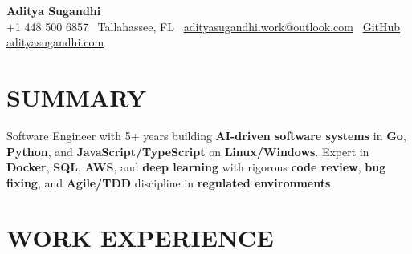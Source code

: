 \documentclass[letterpaper,10pt]{article}
\begin{document}
\begin{center}
{\huge\textbf{Aditya Sugandhi}} \\
+1 448 500 6857 \textbar\ \textcolor{metablue}{Tallahassee, FL} \textbar\
\href{mailto:adityasugandhi.work@outlook.com}{adityasugandhi.work@outlook.com} \textbar\
\href{https://github.com/adityasugandhi}{GitHub}
\textbar \href{https://adityasugandhi.com}{adityasugandhi.com}
\end{center}
\vspace{-12pt}

\section{\textcolor{metablue}{SUMMARY}}
\small
\vspace{-6pt}
Software Engineer with 5+ years building \textbf{AI-driven software systems} in \textbf{Go}, \textbf{Python}, and \textbf{JavaScript/TypeScript} on \textbf{Linux/Windows}. Expert in \textbf{Docker}, \textbf{SQL}, \textbf{AWS}, and \textbf{deep learning} with rigorous \textbf{code review}, \textbf{bug fixing}, and \textbf{Agile/TDD} discipline in \textbf{regulated environments}.

\vspace{-9pt}

\section{\textcolor{metablue}{WORK EXPERIENCE}}
\vspace{-12pt}
\end{document}
